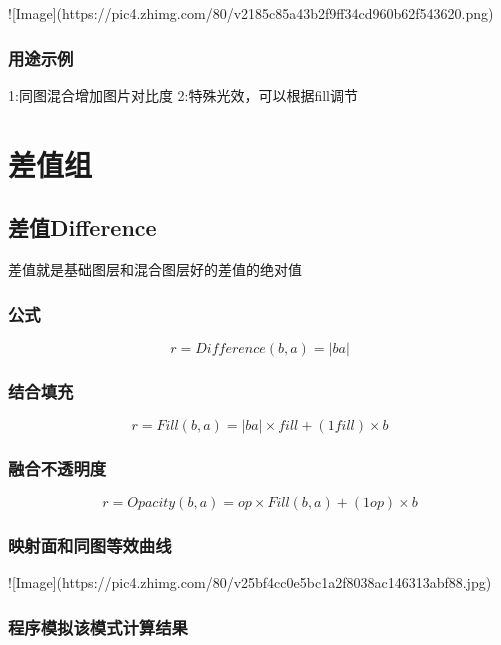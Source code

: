 ![Image](https://pic4.zhimg.com/80/v2185c85a43b2f9ff34cd960b62f543620.png)

\subsubsection{ 用途示例}

1:同图混合增加图片对比度
2:特殊光效，可以根据fill调节

\section{差值组}

\subsection{ 差值Difference}

差值就是基础图层和混合图层好的差值的绝对值

\subsubsection{ 公式}

$$r=Difference(b,a)=|ba|$$

\subsubsection{ 结合填充}

$$r=Fill(b,a)=|ba|\times fill + (1fill)\times b$$

\subsubsection{ 融合不透明度}

$$r=Opacity(b,a)=op\times Fill(b,a)+(1op)\times b$$

\subsubsection{ 映射面和同图等效曲线}

![Image](https://pic4.zhimg.com/80/v25bf4cc0e5bc1a2f8038ac146313abf88.jpg)

\subsubsection{ 程序模拟该模式计算结果}

